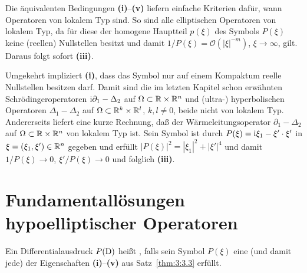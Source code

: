 \begin{exa}
Die äquivalenten Bedingungen  {\bf (i)}--{\bf(v)} liefern einfache Kriterien dafür, wann Operatoren von lokalem Typ sind. So sind alle elliptischen Operatoren von lokalem Typ, da für diese der homogene Hauptteil $p(\xi)$ des Symbols $P(\xi)$ keine (reellen) Nullstellen besitzt und damit $1/P(\xi) = \mathcal O(|\xi|^{-m})$, $\xi\to\infty$, gilt. Daraus folgt sofort {\bf (iii)}. 

Umgekehrt impliziert {\bf (i)}, dass das Symbol nur auf einem Kompaktum reelle Nullstellen besitzen darf. Damit sind die im letzten Kapitel schon erwähnten 
Schrödingeroperatoren $\mathrm i\partial_1-\Delta_2$ auf $\Omega\subset \mathbb R\times\mathbb R^n$ und (ultra-) hyperbolischen Operatoren $\Delta_1-\Delta_2$ auf $\Omega\subset \mathbb R^k\times\mathbb R^l$, $k,l\ne0$, beide nicht von lokalem Typ. Andererseits liefert eine kurze Rechnung, daß der Wärmeleitungsoperator $\partial_1-\Delta_2$ auf $\Omega\subset\mathbb R\times\mathbb R^n$ von lokalem Typ ist. Sein Symbol ist durch $P(\xi) = \mathrm i \xi_1 - \xi'\cdot\xi'$ in $\xi=(\xi_1,\xi')\in\mathbb R^n$ gegeben und erfüllt $|P(\xi)|^2 = |\xi_1|^2+|\xi'|^4$ und damit $1/P(\xi)\to0$, $\xi' / P(\xi)\to0$ und folglich {\bf (iii)}.
\end{exa}

\section{Fundamentallösungen hypoelliptischer Operatoren} %


\begin{df}
Ein Differentialausdruck $P(\mathrm D)$ heißt , falls sein Symbol $P(\xi)$ eine (und damit jede) der Eigenschaften {\bf (i)}--{\bf (v)}
aus Satz~\ref{thm:3:3.3} erfüllt.
\end{df}

